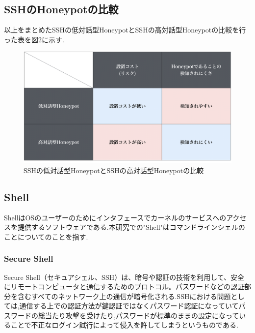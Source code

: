 \subsection{SSHのHoneypotの比較}
\label{tech:CompareHoneypot}
以上をまとめたSSHの低対話型HoneypotとSSHの高対話型Honeypotの比較を行った表を図2に示す.

\vspace{10mm}
\begin{figure}[H]
    \centering
    \includegraphics[width=1.0\textwidth]{figures/compare.png}
    \caption{SSHの低対話型HoneypotとSSHの高対話型Honeypotの比較}
    \label{fig:evo}
\end{figure}


\subsection{Shell}
\label{tech:Shell}
ShellはOSのユーザーのためにインタフェースでカーネルのサービスへのアクセスを提供するソフトウェアである.本研究での"Shell"はコマンドラインシェルのことについてのことを指す.

\subsubsection{Secure Shell}
\label{tech:Secure Shell}
Secure Shell（セキュアシェル、SSH）は、暗号や認証の技術を利用して、安全にリモートコンピュータと通信するためのプロトコル。パスワードなどの認証部分を含むすべてのネットワーク上の通信が暗号化される.\cite{ssh}SSHにおける問題としては,通信する上での認証方法が鍵認証ではなくパスワード認証になっていてパスワードの総当たり攻撃を受けたり,パスワードが標準のままの設定になっていることで不正なログイン試行によって侵入を許してしまうというものである.

